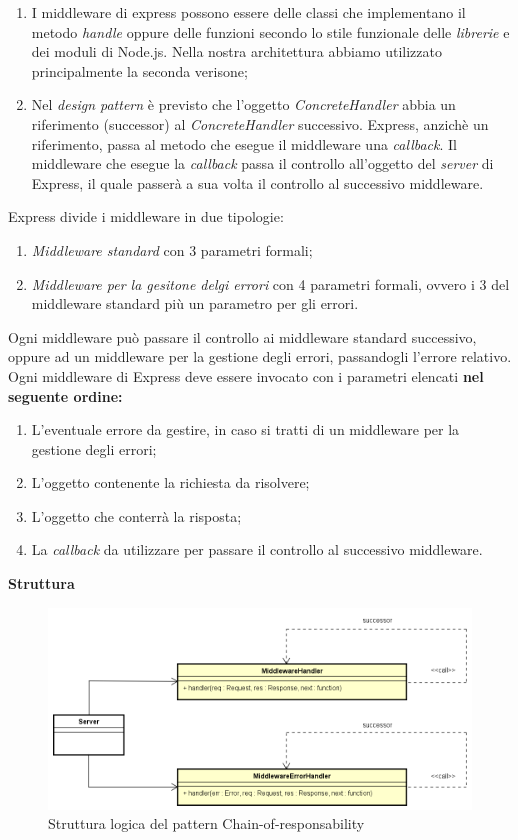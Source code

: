 	\begin{enumerate}
		\item I middleware di express possono essere delle classi che implementano il metodo \textit{handle} oppure delle funzioni secondo lo stile funzionale delle \textit{librerie} e dei moduli di Node.js. Nella nostra architettura abbiamo utilizzato principalmente la seconda verisone;
		\item Nel \textit{design pattern} è previsto che l'oggetto \textit{ConcreteHandler} abbia un riferimento (successor) al \textit{ConcreteHandler} successivo. Express, anzichè un riferimento, passa al metodo che esegue il middleware una \textit{callback}. Il middleware che esegue la \textit{callback} passa il controllo all'oggetto del \textit{server} di Express, il quale passerà a sua volta il controllo al successivo middleware.
	\end{enumerate}
Express divide i middleware in due tipologie:
	\begin{enumerate}
		\item \textit{Middleware standard} con 3 parametri formali;
		\item \textit{Middleware per la gesitone delgi errori} con 4 parametri formali, ovvero i 3 del middleware standard più un parametro per gli errori.
	\end{enumerate}
Ogni middleware può passare il controllo ai middleware standard successivo, oppure ad un middleware per la gestione degli errori, passandogli l'errore relativo. Ogni middleware di Express deve essere invocato con i parametri elencati \textbf{nel seguente ordine:}
	\begin{enumerate}
		\item L'eventuale errore da gestire, in caso si tratti di un middleware per la gestione degli errori;
		\item L'oggetto contenente la richiesta da risolvere;
		\item L'oggetto che conterrà la risposta;
		\item La \textit{callback} da utilizzare per passare il controllo al successivo middleware.
	\end{enumerate}

\textbf{Struttura}
\label{Struttura logica del pattern Chain-of-responsability}
\begin{figure}
	\centering
	\includegraphics[scale=0.50]{UML/strutturaPattern/Chain-of-responsability.png}
	\caption{Struttura logica del pattern Chain-of-responsability}
\end{figure}

